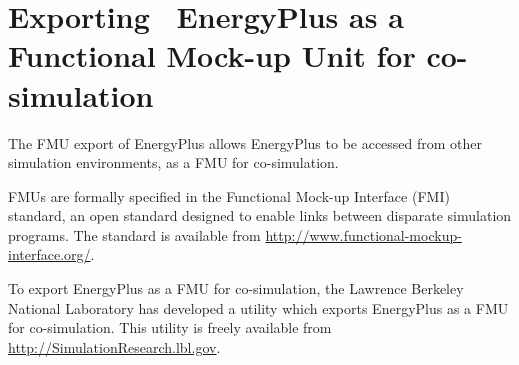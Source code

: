 \section{Exporting~ EnergyPlus as a Functional Mock-up Unit for co-simulation}\label{exporting-energyplus-as-a-functional-mock-up-unit-for-co-simulation}

The FMU export of EnergyPlus allows EnergyPlus to be accessed from other simulation environments, as a FMU for co-simulation.

FMUs are formally specified in the Functional Mock-up Interface (FMI) standard, an open standard designed to enable links between disparate simulation programs. The standard is available from \href{http://www.functional-mockup-interface.org/.\%20}{http://www.functional-mockup-interface.org/}.

To export EnergyPlus as a FMU for co-simulation, the Lawrence Berkeley National Laboratory has developed a utility which exports EnergyPlus as a FMU for co-simulation. This utility is freely available from \url{http://SimulationResearch.lbl.gov}.
